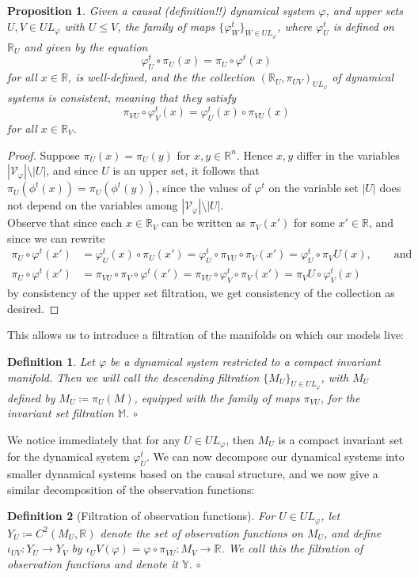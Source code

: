 \documentclass[11pt, a4paper]{memoir}
\theoremstyle{break}
\newtheorem{prop}{Proposition}
\theoremstyle{break}
\newtheorem{innerdefn}{Definition}
\newenvironment{defn}
  {\begin{innerdefn}}
  {\ensuremath{\circ}\end{innerdefn}}
\theoremstyle{nonumberplain}
\newtheorem{proof}{Proof}
\newcommand{\mR}{\mathbb{R}}
\begin{document}
\begin{prop}
Given a causal (\textit{definition!!}) dynamical system $\varphi$, and upper sets $U,V\in UL_\varphi$ with $U\leqslant V$, the family of maps $\{\varphi^t_W\}_{W\in UL_\varphi}$, where $\varphi_U^t$ is defined on $\mR_U$ and given by the equation
$$\varphi^t_U\circ\pi_U(x)=\pi_U\circ \varphi^t(x)$$
for all $x\in \mR$, is well-defined, and the the collection $(\mR_U,\pi_{UV})_{UL_\varphi}$ of dynamical systems is consistent, meaning that they satisfy
$$\pi_{VU}\circ \varphi_V^t(x)=\varphi_U^t(x)\circ\pi_{VU}(x)$$
for all $x\in \mR_V$.
\end{prop}
\begin{proof}
Suppose $\pi_U(x)=\pi_U(y)$ for $x,y\in \mR^n$. Hence $x,y$ differ in the variables $|\mathcal{V}_\varphi|\setminus |U|$, and since $U$ is an upper set, it follows that $\pi_U(\phi^t(x))=\pi_U(\phi^t(y))$, since the values of $\varphi^t$ on the variable set $|U|$ does not depend on the variables  among $|\mathcal{V}_\varphi|\setminus |U|$.\\
Observe that since each $x\in \mR_V$ can be written as $\pi_V(x')$ for some $x'\in \mR$, and since we can rewrite
\begin{align*}
\pi_U\circ\varphi^t(x')
&=\varphi_U^t(x)\circ\pi_U(x')=
\varphi_U^t\circ\pi_{VU}\circ\pi_V(x')=\varphi_U^t\circ\pi_VU(x),\quad\quad \text{and}\\
\pi_U\circ\varphi^t(x')&=\pi_{VU}\circ \pi_V\circ\varphi^t(x')=\pi_{VU}\circ \varphi_V^t\circ \pi_V(x')=\pi_VU\circ\varphi_V^t(x)
\end{align*}
by consistency of the upper set filtration, we get consistency of the collection as desired.
\end{proof}
This allows us to introduce a filtration of the manifolds on which our models live:
\begin{defn}
Let $\varphi$ be a dynamical system restricted to a compact invariant manifold. Then we will call the descending filtration $\{M_U\}_{U\in UL_\varphi}$, with $M_U$ defined by $M_U\coloneqq \pi_U(M)$, equipped with the family of maps $\pi_{VU}$, for the \emph{invariant set filtration} $\mathbb{M}$.
\end{defn}
We notice immediately that for any $U\in UL_\varphi$, then $M_U$ is a compact invariant set for the dynamical system $\varphi^t_U$. We can now decompose our dynamical systems into smaller dynamical systems based on the causal structure, and we now give a similar decomposition of the observation functions:
\begin{defn}[Filtration of observation functions]
For $U\in UL_\varphi$, let $Y_U\coloneqq C^2(M_U,\mR)$ denote the set of observation functions on $M_U$, and define $\iota_{UV}:Y_U\to Y_V$ by $\iota_UV(\varphi)=\varphi\circ \pi_{VU}:M_V\to \mR$. We call this the \emph{filtration of observation functions} and denote it $\mathbb{Y}$.
\end{defn}
\end{document}
